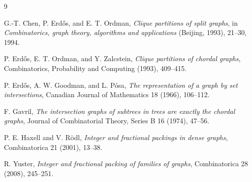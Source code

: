 \documentclass[11pt]{article}
\theoremstyle{definition}
\begin{document}
\begin{thebibliography}{9}

G.-T. Chen, P. Erdős, and E. T. Ordman,
\emph{Clique partitions of split graphs},
in \emph{Combinatorics, graph theory, algorithms and applications} (Beijing, 1993), 21--30, 1994.

P. Erdős, E. T. Ordman, and Y. Zalcstein,
\emph{Clique partitions of chordal graphs},
Combinatorics, Probability and Computing (1993), 409--415.

P. Erdős, A. W. Goodman, and L. Pósa,
\emph{The representation of a graph by set intersections},
Canadian Journal of Mathematics 18 (1966), 106--112.

F. Gavril,
\emph{The intersection graphs of subtrees in trees are exactly the chordal graphs},
Journal of Combinatorial Theory, Series B 16 (1974), 47--56.

P. E. Haxell and V. Rödl,
\emph{Integer and fractional packings in dense graphs},
Combinatorica 21 (2001), 13--38.

R. Yuster,
\emph{Integer and fractional packing of families of graphs},
Combinatorica 28 (2008), 245--251.

\end{thebibliography}
\end{document}
